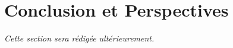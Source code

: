 \chapter{Conclusion et Perspectives}
\label{chap:conclusion}
\textit{Cette section sera rédigée ultérieurement.}
